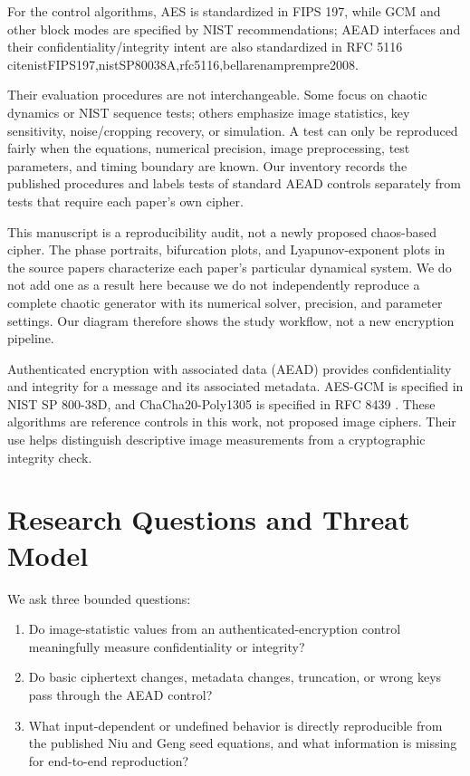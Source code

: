 \documentclass[letterpaper,journal]{IEEEtran}
\begin{document}
For the control algorithms, AES is standardized in FIPS 197, while GCM and other block modes are specified by NIST recommendations; AEAD interfaces and their confidentiality/integrity intent are also standardized in RFC 5116 \\cite{nistFIPS197,nistSP80038A,rfc5116,bellarenamprempre2008}.

Their evaluation procedures are not interchangeable. Some focus on chaotic dynamics or NIST sequence tests; others emphasize image statistics, key sensitivity, noise/cropping recovery, or simulation. A test can only be reproduced fairly when the equations, numerical precision, image preprocessing, test parameters, and timing boundary are known. Our inventory records the published procedures and labels tests of standard AEAD controls separately from tests that require each paper's own cipher.

This manuscript is a reproducibility audit, not a newly proposed chaos-based cipher. The phase portraits, bifurcation plots, and Lyapunov-exponent plots in the source papers characterize each paper's particular dynamical system. We do not add one as a result here because we do not independently reproduce a complete chaotic generator with its numerical solver, precision, and parameter settings. Our diagram therefore shows the study workflow, not a new encryption pipeline.

Authenticated encryption with associated data (AEAD) provides confidentiality and integrity for a message and its associated metadata. AES-GCM is specified in NIST SP 800-38D, and ChaCha20-Poly1305 is specified in RFC 8439 \cite{nistGCM,rfc8439}. These algorithms are reference controls in this work, not proposed image ciphers. Their use helps distinguish descriptive image measurements from a cryptographic integrity check.

\section{Research Questions and Threat Model}
We ask three bounded questions:
\begin{enumerate}
  \item Do image-statistic values from an authenticated-encryption control meaningfully measure confidentiality or integrity?
  \item Do basic ciphertext changes, metadata changes, truncation, or wrong keys pass through the AEAD control?
  \item What input-dependent or undefined behavior is directly reproducible from the published Niu and Geng seed equations, and what information is missing for end-to-end reproduction?
\end{enumerate}
\end{document}

